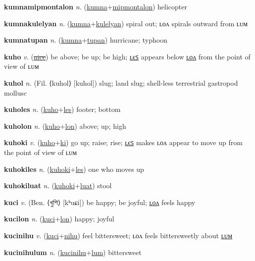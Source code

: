 \textbf{\hypertarget{kumnamipmontalon}{kumnamipmontalon}} \textit{n.} (\hyperlink{kumna}{kumna}+\allowbreak \hyperlink{mipmontalon}{mipmontalon})
helicopter

\textbf{\hypertarget{kumnakulelyan}{kumnakulelyan}} \textit{n.} (\hyperlink{kumna}{kumna}+\allowbreak \hyperlink{kulelyan}{kulelyan})
spiral out; ʟᴏᴧ spirals outward from ʟᴜᴍ

\textbf{\hypertarget{kumnatupan}{kumnatupan}} \textit{n.} (\hyperlink{kumna}{kumna}+\allowbreak \hyperlink{tupan}{tupan})
hurricane; typhoon

\textbf{\hypertarget{kuho}{kuho}} \textit{v.} (\hyperlink{nice}{\sout{nice}})
be above; be up; be high; \hyperlink{kuholes}{ʟєꜱ} appears below \hyperlink{kuholon}{ʟᴏᴧ} from the point of view of ʟᴜᴍ

\textbf{\hypertarget{kuhol}{kuhol}} \textit{n.} (Fil. ⟨kuhol⟩ [kuhol])
slug; land slug; shell-less terrestrial gastropod mollusc

\textbf{\hypertarget{kuholes}{kuholes}} \textit{n.} (\hyperlink{kuho}{kuho}+\allowbreak \hyperlink{les}{les})
footer; bottom

\textbf{\hypertarget{kuholon}{kuholon}} \textit{n.} (\hyperlink{kuho}{kuho}+\allowbreak \hyperlink{lon}{lon})
above; up; high

\textbf{\hypertarget{kuhoki}{kuhoki}} \textit{v.} (\hyperlink{kuho}{kuho}+\allowbreak \hyperlink{ki}{ki})
go up; raise; rise; \hyperlink{kuhokiles}{ʟєꜱ} makes ʟᴏᴧ appear to move up from the point of view of ʟᴜᴍ

\textbf{\hypertarget{kuhokiles}{kuhokiles}} \textit{n.} (\hyperlink{kuhoki}{kuhoki}+\allowbreak \hyperlink{les}{les})
one who moves up

\textbf{\hypertarget{kuhokiluat}{kuhokiluat}} \textit{n.} (\hyperlink{kuhoki}{kuhoki}+\allowbreak \hyperlink{luat}{luat})
stool

\textbf{\hypertarget{kuci}{kuci}} \textit{v.} (Ben. ⟨{\bengali{}খুশি}⟩ [kʰuɕi])
be happy; be joyful; \hyperlink{kucilon}{ʟᴏᴧ} feels happy

\textbf{\hypertarget{kucilon}{kucilon}} \textit{n.} (\hyperlink{kuci}{kuci}+\allowbreak \hyperlink{lon}{lon})
happy; joyful

\textbf{\hypertarget{kucinihu}{kucinihu}} \textit{v.} (\hyperlink{kuci}{kuci}+\allowbreak \hyperlink{nihu}{nihu})
feel bittersweet; ʟᴏᴧ feels bittersweetly about \hyperlink{kucinihulum}{ʟᴜᴍ}

\textbf{\hypertarget{kucinihulum}{kucinihulum}} \textit{n.} (\hyperlink{kucinihu}{kucinihu}+\allowbreak \hyperlink{lum}{lum})
bittersweet

